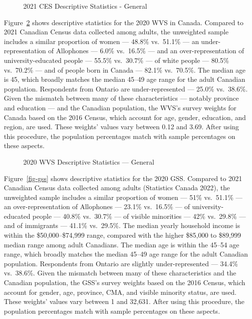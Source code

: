 \documentclass[
  letterpaper,
  DIV=11,
  numbers=noendperiod]{scrreprt}
\begin{document}
\begin{figure}


\caption{\label{fig-ces}2021 CES Descriptive Statistics - General}

\end{figure}%

Figure~\ref{fig-wvs} shows descriptive statistics for the 2020 WVS in
Canada. Compared to 2021 Canadian Census data collected among adults,
the unweighted sample includes a similar proportion of women --- 48.8\%
vs.~51.1\% --- an under-representation of Allophones --- 6.0\%
vs.~16.5\% --- and an over-representation of university-educated people
--- 55.5\% vs.~30.7\% --- of white people --- 80.5\% vs.~70.2\% --- and
of people born in Canada --- 82.1\% vs.~70.5\%. The median age is 45,
which broadly matches the median 45--49 age range for the adult Canadian
population. Respondents from Ontario are under-represented --- 25.0\%
vs.~38.6\%. Given the mismatch between many of these characteristics ---
notably province and education --- and the Canadian population, the
WVS's survey weights for Canada based on the 2016 Census, which account
for age, gender, education, and region, are used. These weights' values
vary between 0.12 and 3.69. After using this procedure, the population
percentages match with sample percentages on these aspects.

\begin{figure}


\caption{\label{fig-wvs}2020 WVS Descriptive Statistics --- General}

\end{figure}%

Figure~\ref{fig-gss} shows descriptive statistics for the 2020 GSS.
Compared to 2021 Canadian Census data collected among adults (Statistics
Canada 2022), the unweighted sample includes a similar proportion of
women --- 51\% vs.~51.1\% --- an over-representation of Allophones ---
23.1\% vs.~16.5\% --- of university-educated people --- 40.8\%
vs.~30.7\% --- of visible minorities --- 42\% vs.~29.8\% --- and of
immigrants --- 41.1\% vs.~29.5\%. The median yearly household income is
within the \$50,000--\$74,999 range, compared with the higher \$85,000
to \$89,999 median range among adult Canadians. The median age is within
the 45--54 age range, which broadly matches the median 45--49 age range
for the adult Canadian population. Respondents from Ontario are slightly
under-represented --- 34.4\% vs.~38.6\%. Given the mismatch between many
of these characteristics and the Canadian population, the GSS's survey
weights based on the 2016 Census, which account for gender, age,
province, CMA, and visible minority status, are used. These weights'
values vary between 1 and 32,631. After using this procedure, the
population percentages match with sample percentages on these aspects.
\end{document}
